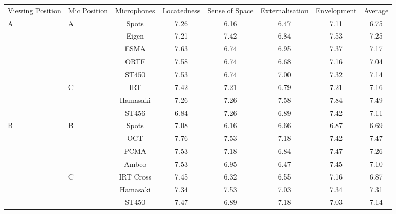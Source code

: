 \begin{tabular}{m{15mm} m{10mm} c c c c c c}

Viewing Position	&	Mic Position	&	Microphones	&	Locatedness	&	Sense of Space	&	Externalisation	&	Envelopment	&	Average	\\
\multirow{8}{*}{A}	&	\multirow{5}{*}{A}	&	Spots	&	7.26	&	6.16	&	6.47	&	7.11	&	6.75	\\
	&		&	Eigen	&	7.21	&	7.42	&	6.84	&	7.53	&	7.25	\\
	&		&	ESMA	&	7.63	&	6.74	&	6.95	&	7.37	&	7.17	\\
	&		&	ORTF	&	7.58	&	6.74	&	6.68	&	7.16	&	7.04	\\
	&		&	ST450	&	7.53	&	6.74	&	7.00	&	7.32	&	7.14	\\
	&	\multirow{3}{*}{C}	&	IRT	&	7.42	&	7.21	&	6.79	&	7.21	&	7.16	\\
	&		&	Hamasaki	&	7.26	&	7.26	&	7.58	&	7.84	&	7.49	\\
	&		&	ST456	&	6.84	&	7.26	&	6.89	&	7.42	&	7.11	\\
\multirow{7}{*}{B}	&	\multirow{4}{*}{B}	&	Spots	&	7.08	&	6.16	&	6.66	&	6.87	&	6.69	\\
	&		&	OCT	&	7.76	&	7.53	&	7.18	&	7.42	&	7.47	\\
	&		&	PCMA	&	7.53	&	7.18	&	6.84	&	7.47	&	7.26	\\
	&		&	Ambeo	&	7.53	&	6.95	&	6.47	&	7.45	&	7.10	\\
	&	\multirow{3}{*}{C}	&	IRT Cross	&	7.45	&	6.32	&	6.55	&	7.16	&	6.87	\\
	&		&	Hamasaki	&	7.34	&	7.53	&	7.03	&	7.34	&	7.31	\\
	&		&	ST450	&	7.47	&	6.89	&	7.18	&	7.03	&	7.14	


\end{tabular}